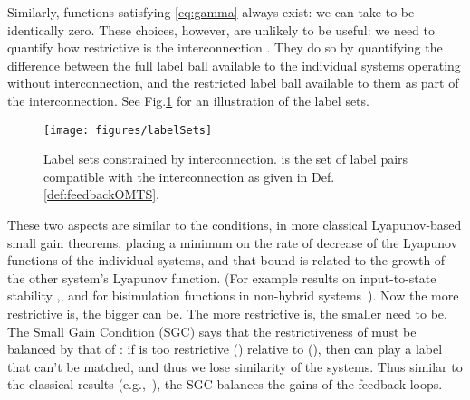 Similarly, functions  satisfying \eqref{eq:gamma} always exist: we can take  to be identically zero.
These choices, however, are unlikely to be useful: we need  to quantify how restrictive is the interconnection .
They do so by quantifying the difference between the full label ball  available to the individual systems operating without interconnection, and the restricted label ball  available to them as part of the interconnection.
See Fig.\ref{fig:labelSets} for an illustration of the label sets.
\begin{figure}
\centering
\texttt{[image: figures/labelSets]}
\caption{Label sets constrained by interconnection.  is the set of label pairs compatible with the interconnection as given in Def.\ref{def:feedbackOMTS}. }
\label{fig:labelSets}
\end{figure}

These two aspects are similar to the conditions, in more classical Lyapunov-based small gain theorems, placing a minimum on the rate of decrease of the Lyapunov functions of the individual systems, and that bound is related to the growth of the other system's Lyapunov function. (For example results on input-to-state stability \cite{JiangMW_LyapunovISS},\cite{SanFelice_IOSS14}, and for bisimulation functions in non-hybrid systems~\cite{Girard_CompositionBisim07}).
Now the more restrictive  is, the bigger  can be.
The more restrictive  is, the smaller  need to be.
The Small Gain Condition (SGC) says that the restrictiveness of  must be balanced by that of :
if  is too restrictive () relative to  (), 
then  can play a label  that can't be matched, and thus we lose similarity of the systems.
Thus similar to the classical results (e.g.,~\cite{Girard_CompositionBisim07}), the SGC balances the gains of the feedback loops.





